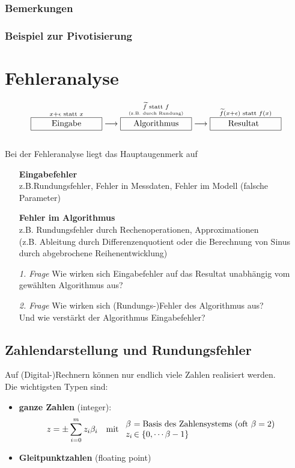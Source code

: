 \documentclass[ngerman,fontsize=11pt, paper=a4, parskip=half, titlepage=true, toc=bib]{scrbook}
\newcommand{\sectione}[1]{\section{#1} \setcounter{equation}{0}}
\begin{document}
\subsection{Bemerkungen}
\subsection{Beispiel zur Pivotisierung}


\chapter{Fehleranalyse} \label{3}
%
\begin{align*}
	\overset{x+\epsilon \text{ statt } x}{\framebox[3cm]{Eingabe}} \longrightarrow 
	\overset{\underset{\text{\tiny (z.B. durch Rundung)}}{\widetilde{f} \text{ statt } f}}{\framebox[3cm]{Algorithmus}} \longrightarrow
	\overset{\widetilde{f}(x+\epsilon) \text{ statt } f(x)}{\framebox[3cm]{Resultat\phantom{g}}}
\end{align*}\\

Bei der Fehleranalyse liegt das Hauptaugenmerk auf
\begin{itemize}
	\item[] \textbf{Eingabefehler}\\ z.B.Rundungsfehler, Fehler in Messdaten, Fehler im Modell (falsche Parameter)
	\item[] \textbf{Fehler im Algorithmus} \\ z.B. Rundungsfehler durch Rechenoperationen, Approximationen \\
	 (z.B. Ableitung durch Differenzenquotient oder die Berechnung von Sinus durch abgebrochene Reihenentwicklung)
	\\
	\item[\textit{1. Frage}] Wie wirken sich Eingabefehler auf das Resultat unabhängig vom gewählten Algorithmus aus?
		\item[\textit{2. Frage}]Wie wirken sich (Rundungs-)Fehler des Algorithmus aus?\\
											Und wie verstärkt der Algorithmus Eingabefehler?
\end{itemize}


\sectione{Zahlendarstellung und Rundungsfehler} \label{3.1}  
Auf (Digital-)Rechnern können nur endlich viele Zahlen realisiert werden. \\
Die wichtigsten Typen sind: 
\begin{itemize}
	\item \textbf{ganze Zahlen}  (integer):
					\begin{align*}
						 z&=\pm \sum_{i=0}^{m}z_i\beta_i & \text{mit }
						 \begin{array}{l@{\,}l}
							 \beta &= \text{Basis des Zahlensystems (oft $\beta=2$)} \\
							 z_i &\in \{0, \cdots \beta-1\}
						 \end{array}
						\end{align*}
	\item \textbf{Gleitpunktzahlen} (floating point) 
\end{itemize}
\end{document}
